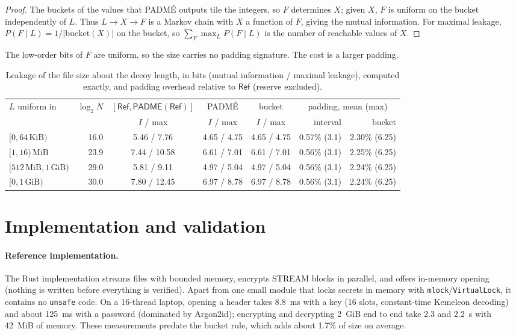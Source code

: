 \documentclass[11pt,a4paper]{article}
\theoremstyle{definition}
\theoremstyle{remark}
\newcommand{\RefSz}{\mathsf{Ref}}
\newcommand{\padme}{\mathsf{PADME}}
\begin{document}
\begin{proof}
The buckets of the values that PADM\'E outputs tile the integers, so $F$ determines $X$; given $X$, $F$ is uniform on the bucket independently of $L$. Thus $L\to X\to F$ is a Markov chain with $X$ a function of $F$, giving the mutual information. For maximal leakage, $P(F\mid L) = 1/|\mathrm{bucket}(X)|$ on the bucket, so $\sum_F\max_L P(F\mid L)$ is the number of reachable values of $X$.
\end{proof}

The low-order bits of $F$ are uniform, so the size carries no padding signature. The cost is a larger padding.

\begin{table}[t]
\centering
\small
\begin{tabular}{@{}lrcccrr@{}}
\toprule
$L$ uniform in & $\log_2 N$ & $[\RefSz,\padme(\RefSz)]$ & PADM\'E & bucket & \multicolumn{2}{c}{padding, mean (max)} \\
 & & $I$ / max & $I$ / max & $I$ / max & interval & bucket \\
\midrule
$[0, 64\,\text{KiB})$ & 16.0 & 5.46 / 7.76 & 4.65 / 4.75 & 4.65 / 4.75 & 0.57\% (3.1) & 2.30\% (6.25) \\
$[1, 16)\,\text{MiB}$ & 23.9 & 7.44 / 10.58 & 6.61 / 7.01 & 6.61 / 7.01 & 0.56\% (3.1) & 2.25\% (6.25) \\
$[512\,\text{MiB}, 1\,\text{GiB})$ & 29.0 & 5.81 / 9.11 & 4.97 / 5.04 & 4.97 / 5.04 & 0.56\% (3.1) & 2.24\% (6.25) \\
$[0, 1\,\text{GiB})$ & 30.0 & 7.80 / 12.45 & 6.97 / 8.78 & 6.97 / 8.78 & 0.56\% (3.1) & 2.24\% (6.25) \\
\bottomrule
\end{tabular}
\caption{Leakage of the file size about the decoy length, in bits (mutual information / maximal leakage), computed exactly, and padding overhead relative to $\RefSz$ (reserve excluded).}
\label{tab:size}
\end{table}

\section{Implementation and validation}
\label{sec:impl}

\paragraph{Reference implementation.} The Rust implementation streams files with bounded memory, encrypts STREAM blocks in parallel, and offers in-memory opening (nothing is written before everything is verified). Apart from one small module that locks secrets in memory with \texttt{mlock}/\texttt{VirtualLock}, it contains no \texttt{unsafe} code. On a 16-thread laptop, opening a header takes 8.8~ms with a key (16 slots, constant-time Kemeleon decoding) and about 125~ms with a password (dominated by Argon2id); encrypting and decrypting 2~GiB end to end take 2.3 and 2.2~s with 42~MiB of memory. These measurements predate the bucket rule, which adds about 1.7\% of size on average.
\end{document}
